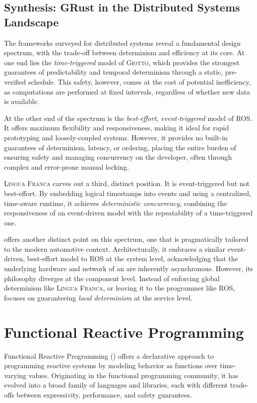 \subsection{Synthesis: GRust in the Distributed Systems Landscape}
\label{sec:sota:distributed:synthesis}

The frameworks surveyed for distributed systems reveal a fundamental design spectrum, with the
trade-off between determinism and efficiency at its core. At one end lies the \emph{time-triggered}
model of \textsc{Giotto}, which provides the strongest guarantees of predictability and temporal
determinism through a static, pre-verified schedule. This safety, however, comes at the cost of
potential inefficiency, as computations are performed at fixed intervals, regardless of whether new
data is available.

At the other end of the spectrum is the \emph{best-effort, event-triggered} model of ROS. It offers
maximum flexibility and responsiveness, making it ideal for rapid prototyping and loosely-coupled
systems. However, it provides no built-in guarantees of determinism, latency, or ordering, placing
the entire burden of ensuring safety and managing concurrency on the developer, often through
complex and error-prone manual locking.

\textsc{Lingua Franca} carves out a third, distinct position. It is event-triggered but not best-effort. By
embedding logical timestamps into events and using a centralized, time-aware runtime, it achieves
\emph{deterministic concurrency}, combining the responsiveness of an event-driven model with the
repeatability of a time-triggered one.

\GRust offers another distinct point on this spectrum, one that is pragmatically tailored to the
modern automotive context. Architecturally, it embraces a similar event-driven, best-effort model to
ROS at the system level, acknowledging that the underlying hardware and network of an \sdv are
inherently asynchronous. However, its philosophy diverges at the component level. Instead of
enforcing global determinism like \textsc{Lingua Franca}, or leaving it to the programmer like ROS,
\GRust focuses on guaranteeing \emph{local determinism} at the service level.

\section{Functional Reactive Programming}
\label{sec:sota:frp}

Functional Reactive Programming (\frp) offers a declarative approach to programming reactive systems
by modeling behavior as functions over time-varying values. Originating in the functional
programming community, it has evolved into a broad family of languages and libraries, each with
different trade-offs between expressivity, performance, and safety guarantees.

